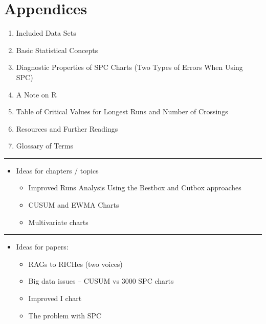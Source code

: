 \documentclass[
]{book}
\providecommand{\tightlist}{%
  \setlength{\itemsep}{0pt}\setlength{\parskip}{0pt}}
\begin{document}
\section*{Appendices}\label{appendices}

\begin{enumerate}
\def\labelenumi{\alph{enumi}.}
\tightlist
\item
  Included Data Sets
\item
  Basic Statistical Concepts
\item
  Diagnostic Properties of SPC Charts (Two Types of Errors When Using SPC)
\item
  A Note on R
\item
  Table of Critical Values for Longest Runs and Number of Crossings
\item
  Resources and Further Readings
\item
  Glossary of Terms
\end{enumerate}

\begin{center}\rule{0.5\linewidth}{0.5pt}\end{center}

\begin{itemize}
\tightlist
\item
  Ideas for chapters / topics

  \begin{itemize}
  \tightlist
  \item
    Improved Runs Analysis Using the Bestbox and Cutbox approaches
  \item
    CUSUM and EWMA Charts
  \item
    Multivariate charts
  \end{itemize}
\end{itemize}

\begin{center}\rule{0.5\linewidth}{0.5pt}\end{center}

\begin{itemize}
\tightlist
\item
  Ideas for papers:

  \begin{itemize}
  \tightlist
  \item
    RAGs to RICHes (two voices)
  \item
    Big data issues -- CUSUM vs 3000 SPC charts
  \item
    Improved I chart
  \item
    The problem with SPC
  \end{itemize}
\end{itemize}
\end{document}
